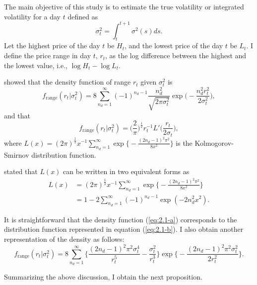 \documentclass[11pt]{article}
\begin{document}
The main objective of this study is to estimate the true volatility or integrated volatility for a day $t$ defined as 
\begin{equation}
\sigma^2_t =\int_{t}^{t+1} \sigma^2(s) ds.
\end{equation}
Let the highest price of the day $t$ be $H_t$, 
and the lowest price of the day $t$ be $L_t$. 
I define the price range in day $t$, $r_t$, as 
the log difference between the highest and the lowest value, i.e., $\log H_t -\log L_t$. 

\cite{Feller(1951)} showed that the density function of range $r_t$ given $\sigma^2_t$ is 
\begin{equation} \label{eq:2.1-a}
f_{\mathrm{range}}(r_t|\sigma^2_t) =8\sum_{n_d=1}^\infty (-1)^{n_d-1} \frac{n_d^2}{\sqrt{2\pi\sigma_t^2}}\exp\bigg( -\frac{n_d^2r_t^2}{2\sigma_t^2} \bigg),
\end{equation}
and that 
\begin{equation}
f_{\mathrm{range}}(r_t|\sigma^2_t) =\bigg( \frac{2}{\pi} \bigg)^{\frac{1}{2}} r_t^{-1} L'\bigg( \frac{r_t}{2\sigma_t} \bigg), 
\end{equation}
where $L(x) =(2\pi)^{\frac{1}{2}} x^{-1} \sum_{n_d=1}^\infty \exp\big\{ -\frac{(2n_d-1)^2\pi^2}{8x^2} \big\}$ is the Kolmogorov-Smirnov distribution function. 

\cite{Feller(1948)} stated that $L(x)$ can be written in two equivalent forms as 
\begin{align}
L(x) &=(2\pi)^{\frac{1}{2}} x^{-1} \sum_{n_d=1}^\infty \exp\bigg\{ -\frac{(2n_d-1)^2\pi^2}{8x^2} \bigg\} \\
&= 1- 2\sum_{n_d=1}^\infty (-1)^{n_d-1} \exp( -2n_d^2x^2 ). \label{eq:2.1-b} 
\end{align}

It is straightforward that the density function (\ref{eq:2.1-a}) corresponds to the distribution function represented in equation (\ref{eq:2.1-b}). 
I also obtain another representation of the density as follows: 
\begin{equation}
f_{\mathrm{range}}(r_t|\sigma^2_t) =8\sum_{n_d=1}^\infty \bigg\{ \frac{(2n_d-1)^2\pi^2\sigma_t^4}{r_t^5} -\frac{\sigma_t^2}{r_t^3} \bigg\} 
\exp\bigg\{ -\frac{(2n_d-1)^2\pi^2\sigma_t^2}{2r_t^2} \bigg\}.
\end{equation}

Summarizing the above discussion, I obtain the next proposition.

\vspace{0.5\baselineskip}
\end{document}
